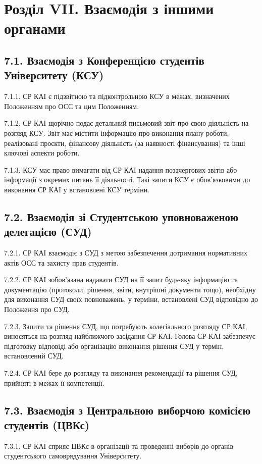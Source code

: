 \section*{Розділ VII. Взаємодія з іншими органами}

\subsection*{7.1. Взаємодія з Конференцією студентів Університету (КСУ)}
    7.1.1. СР КАІ є підзвітною та підконтрольною КСУ в межах, визначених Положенням про ОСС та цим Положенням.

    7.1.2. СР КАІ щорічно подає детальний письмовий звіт про свою діяльність на розгляд КСУ. Звіт має містити інформацію про виконання плану роботи, реалізовані проєкти, фінансову діяльність (за наявності фінансування) та інші ключові аспекти роботи.

    7.1.3. КСУ має право вимагати від СР КАІ надання позачергових звітів або інформації з окремих питань її діяльності. Такі запити КСУ є обов'язковими до виконання СР КАІ у встановлені КСУ терміни.

\subsection*{7.2. Взаємодія зі Студентською уповноваженою делегацією (СУД)}
    7.2.1. СР КАІ взаємодіє з СУД з метою забезпечення дотримання нормативних актів ОСС та захисту прав студентів.

    7.2.2. СР КАІ зобов'язана надавати СУД на її запит будь-яку інформацію та документацію (протоколи, рішення, звіти, внутрішні документи тощо), необхідну для виконання СУД своїх повноважень, у терміни, встановлені СУД відповідно до Положення про СУД.

    7.2.3. Запити та рішення СУД, що потребують колегіального розгляду СР КАІ, виносяться на розгляд найближчого засідання СР КАІ. Голова СР КАІ забезпечує підготовку відповіді або організацію виконання рішення СУД у термін, встановлений СУД.

    7.2.4. СР КАІ бере до розгляду та виконання рекомендації та рішення СУД, прийняті в межах її компетенції.

\subsection*{7.3. Взаємодія з Центральною виборчою комісією студентів (ЦВКс)}
    7.3.1. СР КАІ сприяє ЦВКс в організації та проведенні виборів до органів студентського самоврядування Університету.

